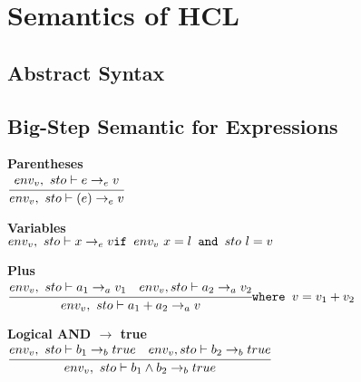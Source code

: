 
\section{Semantics of HCL}





\subsection{Abstract Syntax}





\subsection{Big-Step Semantic for Expressions}
\textbf{Parentheses}\\
\begin{math}
	\cfrac
		{env_v,\ sto \vdash e \rightarrow_e v}
		{env_v,\ sto \vdash (e) \rightarrow_e v}
\end{math}

\textbf{Variables}\\
\begin{math}
	env_v,\ sto \vdash x \rightarrow_e v\\
	\texttt{if } env_v\ x = l
	\texttt{ and } sto\ l = v
\end{math}

\textbf{Plus}\\
\begin{math}
	\cfrac
		{env_v,\ sto \vdash a_1 \rightarrow_a v_1 \quad env_v, sto \vdash a_2 \rightarrow_a v_2}
		{env_v,\ sto \vdash a_1 + a_2 \rightarrow_a v}\\
	\texttt{where } v = v_1 + v_2
\end{math}

\textbf{Logical AND $\rightarrow$ true}\\
\begin{math}
	\cfrac
		{env_v,\ sto \vdash b_1 \rightarrow_b true \quad env_v, sto \vdash b_2 \rightarrow_b true}
		{env_v,\ sto \vdash b_1 \wedge b_2 \rightarrow_b true}
\end{math}

